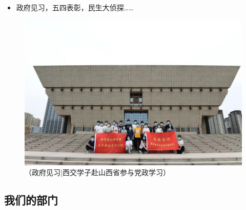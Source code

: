 \documentclass[
decoration,  %
]{qyxf-book}
\begin{document}
\begin{figure}[H]
\begin{minipage}{5cm}
				\end{minipage}
        		\end{figure}
		
	\begin{itemize}
		\item 政府见习，五四表彰，民生大侦探……
	\end{itemize}
	
	\begin{figure}[H]
		\centering
		\includegraphics[]{pics/gdhd.png}
		\caption*{（政府见习|西交学子赴山西省参与党政学习）}
	\end{figure}
	
	
	\subsection{我们的部门}
	
\end{document}
